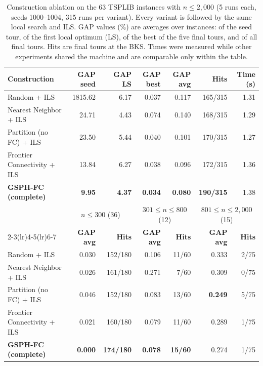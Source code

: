 \documentclass[runningheads]{llncs}
\begin{document}
\begin{table}
\caption{Construction ablation on the 63 TSPLIB instances with
$n\le 2{,}000$ (5 runs each, seeds 1000--1004, 315 runs per variant).
Every variant is followed by the same local search and ILS. GAP values
(\%) are averages over instances: of the seed tour, of the first local
optimum (LS), of the best of the five final tours, and of all final
tours. Hits are final tours at the BKS. Times were measured while other
experiments shared the machine and are comparable only within the
table.}
\label{tab:ablation-constr}
\centering\scriptsize
\begin{tabular}{@{}lrrrrrr@{}}
\toprule
\textbf{Construction} & \textbf{GAP seed} & \textbf{GAP LS} & \textbf{GAP best} & \textbf{GAP avg} & \textbf{Hits} & \textbf{Time (s)}\\
\midrule
Random + ILS                 & 1815.62 & 6.17 & 0.037 & 0.117 & 165/315 & 1.31 \\
Nearest Neighbor + ILS       &   24.71 & 4.43 & 0.074 & 0.140 & 168/315 & 1.29 \\
Partition (no FC) + ILS      &   23.50 & 5.44 & 0.040 & 0.101 & 170/315 & 1.27 \\
Frontier Connectivity + ILS  &   13.84 & 6.27 & 0.038 & 0.096 & 172/315 & 1.36 \\
\textbf{GSPH-FC (complete)}  & \textbf{9.95} & \textbf{4.37} & \textbf{0.034} & \textbf{0.080} & \textbf{190/315} & 1.38 \\
\midrule
& \multicolumn{2}{c}{$n\le 300$ (36)} & \multicolumn{2}{c}{$301\le n\le 800$ (12)} & \multicolumn{2}{c}{$801\le n\le 2{,}000$ (15)}\\
\cmidrule(lr){2-3}\cmidrule(lr){4-5}\cmidrule(lr){6-7}
& \textbf{GAP avg} & \textbf{Hits} & \textbf{GAP avg} & \textbf{Hits} & \textbf{GAP avg} & \textbf{Hits}\\
\midrule
Random + ILS                 & 0.030 & 152/180 & 0.106 & 11/60 & 0.333 & 2/75 \\
Nearest Neighbor + ILS       & 0.026 & 161/180 & 0.271 &  7/60 & 0.309 & 0/75 \\
Partition (no FC) + ILS      & 0.046 & 152/180 & 0.083 & 13/60 & \textbf{0.249} & 5/75 \\
Frontier Connectivity + ILS  & 0.021 & 160/180 & 0.079 & 11/60 & 0.289 & 1/75 \\
\textbf{GSPH-FC (complete)}  & \textbf{0.000} & \textbf{174/180} & \textbf{0.078} & \textbf{15/60} & 0.274 & 1/75 \\
\bottomrule
\end{tabular}
\end{table}
\end{document}
